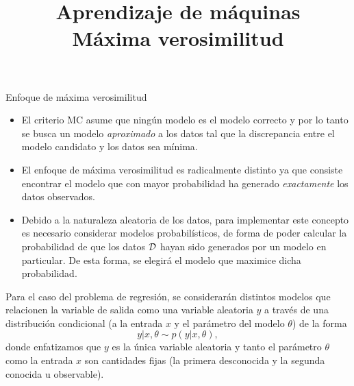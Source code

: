 \documentclass[9pt]{beamer}
\title{\textbf{Aprendizaje de máquinas} \\ Máxima verosimilitud}
\begin{document}
\begin{frame}
  \titlepage
\end{frame}

\begin{frame}{Enfoque de máxima verosimilitud}

\begin{itemize}
	\item El criterio MC asume que ningún modelo es el modelo correcto y por lo tanto se busca un modelo \emph{aproximado} a los datos tal que la discrepancia entre el modelo candidato y los datos sea mínima.\pause
	\item El enfoque de máxima verosimilitud es radicalmente distinto ya que consiste encontrar el modelo que con mayor probabilidad ha generado \emph{exactamente} los datos observados.\pause
	\item Debido a la naturaleza aleatoria de los datos, para implementar este concepto es necesario considerar modelos probabilísticos, de forma de poder calcular la probabilidad de que los datos ${\mathcal D}$ hayan sido generados por un modelo en particular. De esta forma, se elegirá el modelo que maximice dicha probabilidad.\pause
\end{itemize}
	
Para el caso del problema de regresión, se considerarán distintos modelos que relacionen la variable de salida como una variable aleatoria $y$ a través de una distribución condicional (a la entrada $x$ y el parámetro del modelo $\theta$) de la forma 
\begin{equation*}
	y|x,\theta \sim p(y|x,\theta),\label{eq:mod_gen}
\end{equation*}
donde enfatizamos que $y$ es  la única variable aleatoria y tanto el parámetro $\theta$ como la entrada $x$ son cantidades fijas (la primera desconocida y la segunda conocida u observable).
	
\end{frame}
\end{document}
